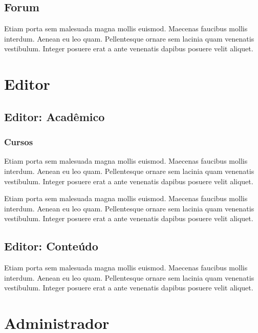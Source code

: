 \documentclass[letterpaper,10pt,english]{sphinxmanual}
\begin{document}
\section{Forum}
\label{user/forum::doc}\label{user/forum:forum}
Etiam porta sem malesuada magna mollis euismod. Maecenas faucibus mollis interdum. Aenean eu leo quam. Pellentesque ornare sem lacinia quam venenatis vestibulum. Integer posuere erat a ante venenatis dapibus posuere velit aliquet.


\chapter{Editor}
\label{index:editor}

\section{Editor: Acadêmico}
\label{editor/academic:editor-academico}\label{editor/academic::doc}

\subsection{Cursos}
\label{editor/academic-courses:cursos}\label{editor/academic-courses::doc}
Etiam porta sem malesuada magna mollis euismod. Maecenas faucibus mollis interdum. Aenean eu leo quam. Pellentesque ornare sem lacinia quam venenatis vestibulum. Integer posuere erat a ante venenatis dapibus posuere velit aliquet.

Etiam porta sem malesuada magna mollis euismod. Maecenas faucibus mollis interdum. Aenean eu leo quam. Pellentesque ornare sem lacinia quam venenatis vestibulum. Integer posuere erat a ante venenatis dapibus posuere velit aliquet.


\section{Editor: Conteúdo}
\label{editor/content:editor-conteudo}\label{editor/content::doc}
Etiam porta sem malesuada magna mollis euismod. Maecenas faucibus mollis interdum. Aenean eu leo quam. Pellentesque ornare sem lacinia quam venenatis vestibulum. Integer posuere erat a ante venenatis dapibus posuere velit aliquet.


\chapter{Administrador}
\label{index:administrador}
\end{document}
